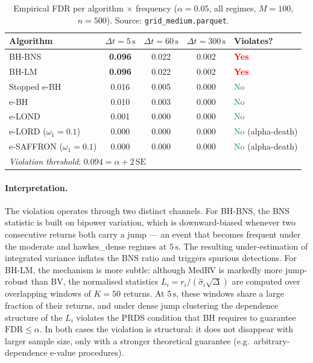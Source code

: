 \documentclass[11pt,a4paper,twocolumn]{article}
\theoremstyle{plain}
\theoremstyle{definition}
\theoremstyle{remark}
\newcommand{\dt}{\Delta}
\newcommand{\FDR}{\mathrm{FDR}}
\begin{document}
\begin{table}[t]
\centering
\caption{Empirical FDR per algorithm $\times$ frequency ($\alpha = 0.05$, all regimes, $M = 100$, $n = 500$). Source: \texttt{grid\_medium.parquet}.}
\label{tab:fdr_freq}
\begin{tabular}{lcccl}
\toprule
Algorithm & $\Delta t = 5\,\mathrm{s}$ & $\Delta t = 60\,\mathrm{s}$ & $\Delta t = 300\,\mathrm{s}$ & Violates? \\
\midrule
BH-BNS & \textbf{0.096} & 0.022 & 0.002 & \textcolor{red}{\textbf{Yes}} \\
BH-LM & \textbf{0.096} & 0.022 & 0.002 & \textcolor{red}{\textbf{Yes}} \\
Stopped e-BH & 0.016 & 0.005 & 0.000 & \textcolor{teal}{No} \\
e-BH & 0.010 & 0.003 & 0.000 & \textcolor{teal}{No} \\
e-LOND & 0.001 & 0.000 & 0.000 & \textcolor{teal}{No} \\
e-LORD ($\omega_1 = 0.1$) & 0.000 & 0.000 & 0.000 & \textcolor{teal}{No} (alpha-death) \\
e-SAFFRON ($\omega_1 = 0.1$) & 0.000 & 0.000 & 0.000 & \textcolor{teal}{No} (alpha-death) \\
\midrule
\multicolumn{4}{l}{\textit{Violation threshold}: $0.094 = \alpha + 2\,\mathrm{SE}$} & \\
\bottomrule
\end{tabular}
\end{table}

\paragraph{Interpretation.}
The violation operates through two distinct channels. For BH-BNS, the BNS
statistic is built on bipower variation, which is downward-biased whenever two
consecutive returns both carry a jump --- an event that becomes frequent under
the moderate and hawkes\_dense regimes at $5\,\mathrm{s}$. The resulting
under-estimation of integrated variance inflates the BNS ratio and triggers
spurious detections. For BH-LM, the mechanism is more subtle: although MedRV
is markedly more jump-robust than BV, the normalised statistics
$L_i = r_i / (\hat{\sigma}_i\sqrt{\dt})$ are computed over overlapping windows
of $K = 50$ returns. At $5\,\mathrm{s}$, these windows share a large fraction
of their returns, and under dense jump clustering the dependence structure of
the $L_i$ violates the PRDS condition that BH requires to guarantee
$\FDR \le \alpha$. In both cases the violation is structural: it does not
disappear with larger sample size, only with a stronger theoretical guarantee
(e.g.\ arbitrary-dependence e-value procedures).
\end{document}
